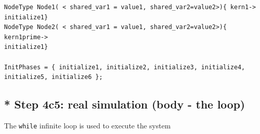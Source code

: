 \begin{verbatim}
NodeType Node1( < shared_var1 = value1, shared_var2=value2>){ kern1->
initialize1}
NodeType Node2( < shared_var1 = value1, shared_var2=value2>){ kern1prime->
initialize1}

InitPhases = { initialize1, initialize2, initialize3, initialize4, initialize5, initialize6 };
\end{verbatim}


\subsection{* Step 4c5: real simulation (body - the loop)}
\label{sec:GSL-simulations-part-time-loop}
\label{sec:Simulation-timing-loop}

The \verb!while! infinite loop is used to execute the system

